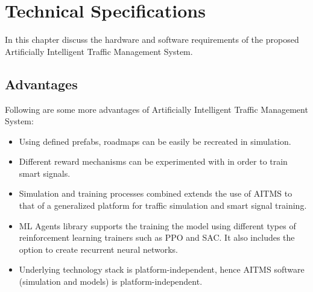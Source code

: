 \documentclass[openany,12pt]{report}
\begin{document}
	
	\chapter{Technical Specifications}
	\hspace*{0.5in}In this chapter discuss the hardware and software requirements of the proposed Artificially Intelligent Traffic Management System.
	
	
		\section{Advantages}
		Following are some more advantages of Artificially Intelligent Traffic Management System:
		\begin{itemize}
			\item{Using defined prefabs, roadmaps can be easily be recreated in simulation.}
			\item{Different reward mechanisms can be experimented with in order to train smart signals.}
			\item{Simulation and training processes combined extends the use of AITMS to that of a generalized platform for traffic simulation and smart signal training.}
			\item{ML Agents library supports the training the model using different types of reinforcement learning trainers such as PPO and SAC. It also includes the option to create recurrent neural networks. }
			\item{Underlying technology stack is platform-independent, hence AITMS software (simulation and models) is platform-independent.}	
		\end{itemize}
		

		\newpage
\end{document}
